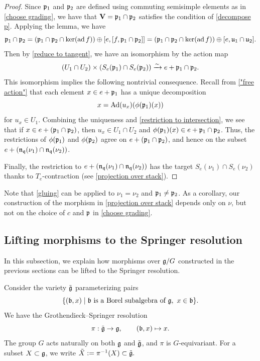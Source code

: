 \documentclass[11pt]{article}
\numberwithin{equation}{section}
\begin{document}
\begin{proof}
    Since $\mathfrak{p}_1$ and $\mathfrak{p}_2$ are defined using commuting semisimple elements as in \cref{choose grading}, we have that $\mathbf{V}= \mathfrak{p}_1\cap \mathfrak{p}_2$ satisfies the condition of \cref{decompose p}. Applying the lemma, we have 
$$\mathfrak{p}_1\cap \mathfrak{p}_2= (\mathfrak{p}_1\cap \mathfrak{p}_2\cap \ker(\operatorname{ad} f))\oplus [e,[f,\mathfrak{p}_1\cap\mathfrak{p}_2]]= (\mathfrak{p}_1\cap \mathfrak{p}_2\cap \ker(\operatorname{ad} f))\oplus [e,\mathfrak{u}_1\cap \mathfrak{u}_2]. $$
    Then by \cref{reduce to tangent}, we have an isomorphism by the action map
    \begin{equation} \label{restriction to intersection}
        (U_1\cap U_2)\times (S_e(\mathfrak{p}_1)\cap S_e(\mathfrak{p}_2))\xrightarrow{\sim} e+ \mathfrak{p}_1\cap \mathfrak{p}_2.
    \end{equation}
This isomorphism implies the following nontrivial consequence. Recall from \cref{"free action"} that each element $x\in e+\mathfrak{p}_1$ has a unique decomposition $$x= \operatorname{Ad}(u_x)(\phi(\mathfrak{p}_1)(x))$$ for $u_x\in U_1$. Combining the uniqueness and \eqref{restriction to intersection}, we see that if $x\in e+ (\mathfrak{p}_1\cap \mathfrak{p}_2)$, then $u_x\in U_1\cap U_2$ and $\phi(\mathfrak{p}_1)(x)\in e+\mathfrak{p}_1\cap \mathfrak{p}_2$. Thus, the restrictions of $\phi(\mathfrak{p}_1)$ and $\phi(\mathfrak{p}_2)$ agree on $e+(\mathfrak{p}_1\cap \mathfrak{p}_2)$, and hence on the subset $e+ (\mathfrak{n}_{\mathfrak{q}}(\nu_1)\cap \mathfrak{n}_{\mathfrak{q}}(\nu_2))$. 

Finally, the restriction to $e+ (\mathfrak{n}_{\mathfrak{q}}(\nu_1)\cap \mathfrak{n}_{\mathfrak{q}}(\nu_2))$ has the target ${S}_e(\nu_1)\cap {S}_e(\nu_2)$ thanks to $T_e$-contraction (see \cref{projection over stack}).
\end{proof}
\begin{rem}\label{independence of c and p}
    Note that \cref{gluing} can be applied to $\nu_1=\nu_2$ and $\mathfrak{p}_1\neq \mathfrak{p}_2$. As a corollary, our construction of the morphism in \cref{projection over stack} depends only on $\nu$, but not on the choice of $c$ and $\mathfrak{p}$ in \cref{choose grading}.
\end{rem}

\subsection{Lifting morphisms to the Springer resolution}

In this subsection, we explain how morphisms over $\mathfrak{g}/G$ constructed
in the previous sections can be lifted to the Springer resolution.

Consider the variety $\tilde{\mathfrak{g}}$ parameterizing pairs
\[
\{(\mathfrak{b}, x) \mid \mathfrak{b} \text{ is a Borel subalgebra of } \mathfrak{g},\ x\in \mathfrak{b} \}.
\]
We have the Grothendieck--Springer resolution
\[
\pi: \tilde{\mathfrak{g}}\to \mathfrak{g}, \qquad (\mathfrak{b},x)\mapsto x.
\]
The group $G$ acts naturally on both $\mathfrak{g}$ and $\tilde{\mathfrak{g}}$, and
$\pi$ is $G$-equivariant. For a subset $X\subset \mathfrak{g}$, we write
$\tilde{X} := \pi^{-1}(X) \subset \tilde{\mathfrak{g}}.$
\end{document}
